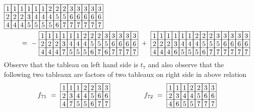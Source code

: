 \begin{align*}
&
\begin{array}[c]{*{14}c}\cline{1-14}
\lr{1}&\lr{1}&\lr{1}&\lr{1}&\lr{1}&\lr{1}&\lr{2}&\lr{2}&\lr{2}&\lr{3}&\lr{3}&\lr{3}&\lr{3}&\lr{3}\\\cline{1-14}
\lr{2}&\lr{2}&\lr{2}&\lr{3}&\lr{4}&\lr{4}&\lr{4}&\lr{5}&\lr{5}&\lr{6}&\lr{6}&\lr{6}&\lr{6}&\lr{6}\\\cline{1-14}
\lr{4}&\lr{4}&\lr{4}&\lr{5}&\lr{5}&\lr{5}&\lr{5}&\lr{6}&\lr{7}&\lr{7}&\lr{7}&\lr{7}&\lr{7}&\lr{7}\\\cline{1-14}
\end{array}\\
&\hspace{20pt}
\ =\ -\ 
\begin{array}[c]{*{14}c}\cline{1-14}
\lr{1}&\lr{1}&\lr{1}&\lr{1}&\lr{1}&\lr{1}&\lr{2}&\lr{2}&\lr{2}&\lr{3}&\lr{3}&\lr{3}&\lr{3}&\lr{3}\\\cline{1-14}
\lr{2}&\lr{2}&\lr{2}&\lr{3}&\lr{4}&\lr{4}&\lr{4}&\lr{5}&\lr{5}&\lr{5}&\lr{6}&\lr{6}&\lr{6}&\lr{6}\\\cline{1-14}
\lr{4}&\lr{4}&\lr{4}&\lr{7}&\lr{5}&\lr{5}&\lr{5}&\lr{6}&\lr{7}&\lr{6}&\lr{7}&\lr{7}&\lr{7}&\lr{7}\\\cline{1-14}
\end{array}
\ +\ 
\begin{array}[c]{*{14}c}\cline{1-14}
\lr{1}&\lr{1}&\lr{1}&\lr{1}&\lr{1}&\lr{1}&\lr{2}&\lr{2}&\lr{2}&\lr{3}&\lr{3}&\lr{3}&\lr{3}&\lr{3}\\\cline{1-14}
\lr{2}&\lr{2}&\lr{2}&\lr{3}&\lr{4}&\lr{4}&\lr{4}&\lr{5}&\lr{5}&\lr{5}&\lr{6}&\lr{6}&\lr{6}&\lr{6}\\\cline{1-14}
\lr{4}&\lr{4}&\lr{4}&\lr{6}&\lr{5}&\lr{5}&\lr{5}&\lr{6}&\lr{7}&\lr{7}&\lr{7}&\lr{7}&\lr{7}&\lr{7}\\\cline{1-14}
\end{array}
\end{align*}
Observe that the tableau on left hand side is \(t_7\) and also observe that the following two tableaux are factors of two tableaux on right side in above relation
\begin{align*}
f_{71}\ =\ 
\begin{array}[c]{*{7}c}\cline{1-7}
\lr{1}&\lr{1}&\lr{1}&\lr{2}&\lr{2}&\lr{3}&\lr{3}\\\cline{1-7}
\lr{2}&\lr{3}&\lr{4}&\lr{4}&\lr{5}&\lr{6}&\lr{6}\\\cline{1-7}
\lr{4}&\lr{7}&\lr{5}&\lr{5}&\lr{6}&\lr{7}&\lr{7}\\\cline{1-7}
\end{array}
\hspace{50pt}
f_{72}\ =\ 
\begin{array}[c]{*{7}c}\cline{1-7}
\lr{1}&\lr{1}&\lr{1}&\lr{2}&\lr{2}&\lr{3}&\lr{3}\\\cline{1-7}
\lr{2}&\lr{3}&\lr{4}&\lr{4}&\lr{5}&\lr{6}&\lr{6}\\\cline{1-7}
\lr{4}&\lr{6}&\lr{5}&\lr{5}&\lr{7}&\lr{7}&\lr{7}\\\cline{1-7}
\end{array}
\end{align*}

